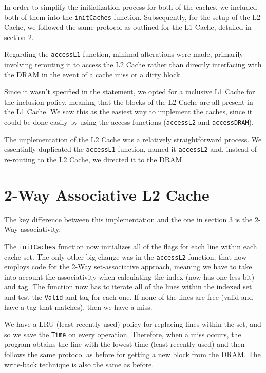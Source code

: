 \documentclass[12pt]{article}
\begin{document}
    In order to simplify the initialization process for both of the caches, we included both of them into the \texttt{initCaches}
    function. Subsequently, for the setup of the L2 Cache, we followed the same protocol as outlined for the L1 Cache, detailed in \hyperref[S2]{section 2}.

    Regarding the \texttt{accessL1} function, minimal alterations were made, primarily involving rerouting it to access the L2 Cache rather than directly
    interfacing with the DRAM in the event of a cache miss or a dirty block.

    Since it wasn't specified in the statement, we opted for a inclusive L1 Cache for the inclusion policy, meaning that the blocks of the L2 Cache are all present
    in the L1 Cache. We saw this as the easiest way to implement the caches, since it could be done easily by using the access functions (\texttt{accessL2} and
    \texttt{accessDRAM}).

    The implementation of the L2 Cache was a relatively straightforward process. We essentially duplicated the \texttt{accessL1} function, named it \texttt{accessL2} and,
    instead of re-routing to the L2 Cache, we directed it to the DRAM.

    \section{2-Way Associative L2 Cache}

    The key difference between this implementation and the one in \hyperref[S3]{section 3} is the 2-Way associativity.

    The \texttt{initCaches} function now initializes all of the flags for each line within each cache set. The only other big change was in the \texttt{accessL2} function,
    that now employs code for the 2-Way set-associative approach, meaning we have to take into account the associativity when calculating the index (now has one less bit)
    and tag.  The function now has to iterate all of the lines within the indexed set and test the \texttt{Valid} and tag for each one. If none of the lines are free
    (valid and have a tag that matches), then we have a miss.

    We have a LRU (least recently used) policy for replacing lines within the set, and so we save the \texttt{Time} on every operation. Therefore, when a miss occurs,
    the program obtains the line with the lowest time (least recently used) and then follows the same protocol as before for getting a new block from the DRAM.
    The write-back technique is also the same \hyperref[WBP]{as before}.
\end{document}

